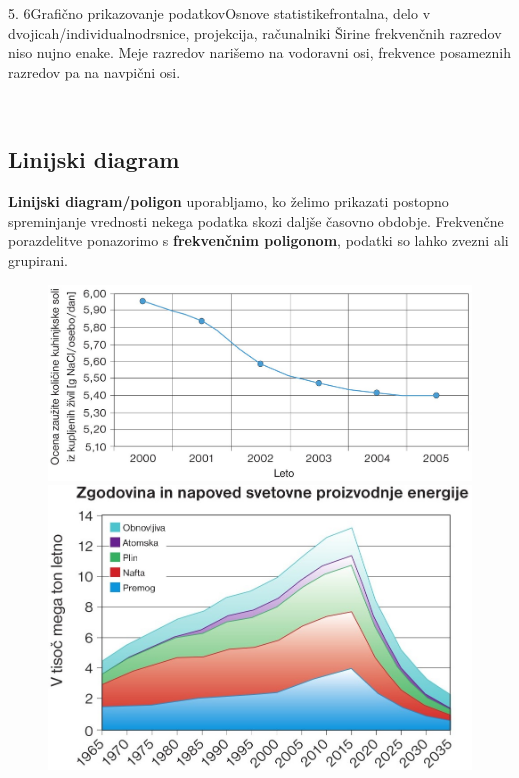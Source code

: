 \begin{priprava}{5. 6}{}{Grafično prikazovanje podatkov}{Osnove statistike}{frontalna, delo v dvojicah/individualno}{drsnice, projekcija, računalniki}
    Širine frekvenčnih razredov niso nujno enake.
    Meje razredov narišemo na vodoravni osi, frekvence posameznih razredov pa na navpični osi.



            




~

\subsection*{Linijski diagram}

    \textbf{Linijski diagram/poligon} uporabljamo, ko želimo prikazati postopno spreminjanje vrednosti nekega podatka skozi daljše časovno obdobje.
    Frekvenčne porazdelitve ponazorimo s \textbf{frekvenčnim poligonom}, podatki so lahko zvezni ali grupirani.
        
            \begin{figure}[H]
                \includegraphics[scale=0.23]{../../Slike_in_skice/1166.jpg}
                \includegraphics[scale=0.3]{../../Slike_in_skice/1099.jpg}
            \end{figure}
            


\end{priprava}
